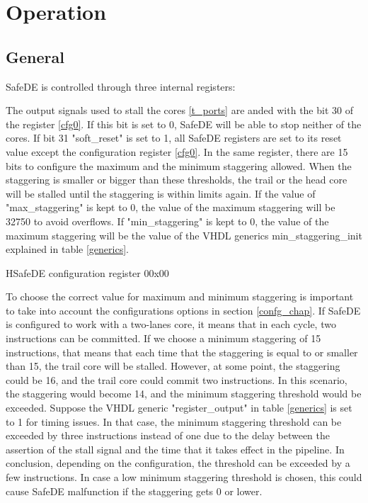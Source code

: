 \newpage
\section{Operation}
\label{operation_chap}
\subsection{General}
SafeDE is controlled through three internal registers:

The output signals used to stall the cores \ref{t_ports} are anded with the bit 30 of the register \ref{cfg0}. If this bit is set to 0, SafeDE will be able to stop neither of the cores. If bit 31 "soft\_reset" is set to 1, all SafeDE registers are set to its reset value except the configuration register \ref{cfg0}. In the same register, there are 15 bits to configure the maximum and the minimum staggering allowed. When the staggering is smaller or bigger than these thresholds, the trail or the head core will be stalled until the staggering is within limits again. If the value of "max\_staggering" is kept to 0, the value of the maximum staggering will be 32750 to avoid overflows. If "min\_staggering" is kept to 0, the value of the maximum staggering will be the value of the VHDL generics min\_staggering\_init explained in table \ref{generics}.

\begin{register}{H}{SafeDE configuration register 0}{0x00}
	\label{cfg0}
	\regnewline
\end{register}

To choose the correct value for maximum and minimum staggering is important to take into account the configurations options in section \ref{confg_chap}. If SafeDE is configured to work with a two-lanes core, it means that in each cycle, two instructions can be committed. If we choose a minimum staggering of 15 instructions, that means that each time that the staggering is equal to or smaller than 15, the trail core will be stalled. However, at some point, the staggering could be 16, and the trail core could commit two instructions. In this scenario, the staggering would become 14, and the minimum staggering threshold would be exceeded. Suppose the VHDL generic "register\_output" in table \ref{generics} is set to 1 for timing issues. In that case, the minimum staggering threshold can be exceeded by three instructions instead of one due to the delay between the assertion of the stall signal and the time that it takes effect in the pipeline. In conclusion, depending on the configuration, the threshold can be exceeded by a few instructions. In case a low minimum staggering threshold is chosen, this could cause SafeDE malfunction if the staggering gets 0 or lower.

